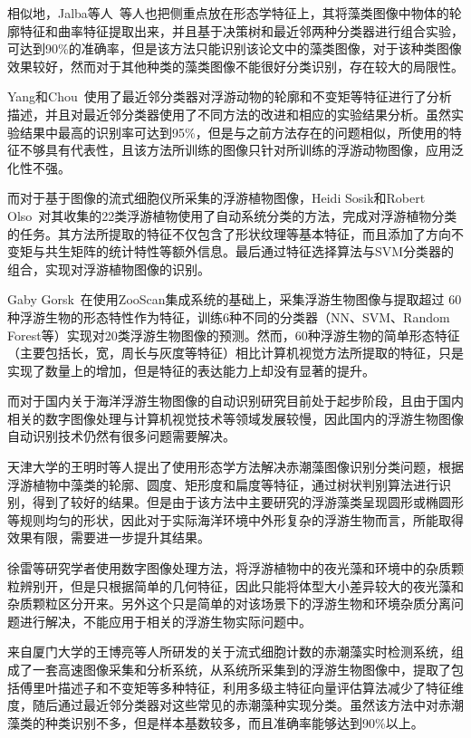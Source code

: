 相似地，Jalba等人~\cite{jalba2005automatic}等人也把侧重点放在形态学特征上，其将藻类图像中物体的轮廓特征和曲率特征提取出来，并且基于决策树和最近邻两种分类器进行组合实验，可达到90\%的准确率，但是该方法只能识别该论文中的藻类图像，对于该种类图像效果较好，然而对于其他种类的藻类图像不能很好分类识别，存在较大的局限性。 

Yang和Chou~\cite{yang2005comparative}使用了最近邻分类器对浮游动物的轮廓和不变矩等特征进行了分析描述，并且对最近邻分类器使用了不同方法的改进和相应的实验结果分析。虽然实验结果中最高的识别率可达到95\%，但是与之前方法存在的问题相似，所使用的特征不够具有代表性，且该方法所训练的图像只针对所训练的浮游动物图像，应用泛化性不强。 

而对于基于图像的流式细胞仪所采集的浮游植物图像，Heidi Sosik和Robert Olso~\cite{sosik2007automated}对其收集的22类浮游植物使用了自动系统分类的方法，完成对浮游植物分类的任务。其方法所提取的特征不仅包含了形状纹理等基本特征，而且添加了方向不变矩与共生矩阵的统计特性等额外信息。最后通过特征选择算法与SVM分类器的组合，实现对浮游植物图像的识别。

Gaby Gorsk~\cite{gorsky2010digital}在使用ZooScan集成系统的基础上，采集浮游生物图像与提取超过 60 种浮游生物的形态特性作为特征，训练6种不同的分类器（NN、SVM、Random Forest等）实现对20类浮游生物图像的预测。然而，60种浮游生物的简单形态特征（主要包括长，宽，周长与灰度等特征）相比计算机视觉方法所提取的特征，只是实现了数量上的增加，但是特征的表达能力上却没有显著的提升。 



而对于国内关于海洋浮游生物图像的自动识别研究目前处于起步阶段，且由于国内相关的数字图像处理与计算机视觉技术等领域发展较慢，因此国内的浮游生物图像自动识别技术仍然有很多问题需要解决。

天津大学的王明时等人\cite{wangmingshi2004}提出了使用形态学方法解决赤潮藻图像识别分类问题，根据浮游植物中藻类的轮廓、圆度、矩形度和扁度等特征，通过树状判别算法进行识别，得到了较好的结果。但是由于该方法中主要研究的浮游藻类呈现圆形或椭圆形等规则均匀的形状，因此对于实际海洋环境中外形复杂的浮游生物而言，所能取得效果有限，需要进一步提升其结果。

徐雷等研究学者\cite{xulei2003}使用数字图像处理方法，将浮游植物中的夜光藻和环境中的杂质颗粒辨别开，但是只根据简单的几何特征，因此只能将体型大小差异较大的夜光藻和杂质颗粒区分开来。另外这个只是简单的对该场景下的浮游生物和环境杂质分离问题进行解决，不能应用于相关的浮游生物实际问题中。 

来自厦门大学的王博亮等人\cite{zheng2009}所研发的关于流式细胞计数的赤潮藻实时检测系统，组成了一套高速图像采集和分析系统，从系统所采集到的浮游生物图像中，提取了包括傅里叶描述子和不变矩等多种特征，利用多级主特征向量评估算法减少了特征维度，随后通过最近邻分类器对这些常见的赤潮藻种实现分类。虽然该方法中对赤潮藻类的种类识别不多，但是样本基数较多，而且准确率能够达到90\%以上。 

